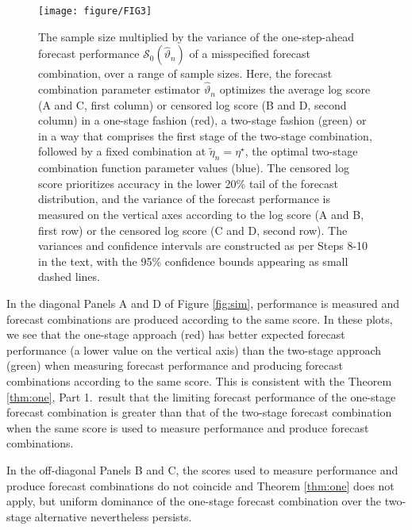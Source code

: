\documentclass[12pt]{article}
\theoremstyle{definition}
\theoremstyle{remark}
\begin{document}
\begin{figure*}[t]
\texttt{[image: figure/FIG3]}
\caption{The sample size multiplied by the variance of the one-step-ahead forecast performance $\mathcal{S}_0(\hat{\vartheta}_n)$ of a misspecified forecast combination, over a range of sample sizes. Here, the forecast combination parameter estimator $\hat{\vartheta}_n$ optimizes the average log score (A and C, first column) or censored log score (B and D, second column) in a one-stage fashion (red), a two-stage fashion (green) or in a way that comprises the first stage of the two-stage combination, followed by a fixed combination at $\tilde{\eta}_n = \eta^{\star}$, the optimal two-stage combination function parameter values (blue). The censored log score prioritizes accuracy in the lower 20\% tail of the forecast distribution, and the variance of the forecast performance is measured on the vertical axes according to the log score (A and B, first row) or the censored log score (C and D, second row). The variances and confidence intervals are constructed as per Steps 8-10 in the text, with the 95\% confidence bounds appearing as small dashed lines.}
\label{fig:sim3}
\end{figure*}

In the diagonal Panels A and D of Figure \ref{fig:sim}, performance is measured and forecast combinations are produced according to the same score. In these plots, we see that the one-stage approach (red) has better expected forecast performance (a lower value on the vertical axis) than the two-stage approach (green) when measuring forecast performance and producing forecast combinations according to the same score. This is consistent with the Theorem \ref{thm:one}, Part 1.\ result that the limiting forecast performance of the one-stage forecast combination is greater than that of the two-stage forecast combination when the same score is used to measure performance and produce forecast combinations.

In the off-diagonal Panels B and C, the scores used to measure performance and produce forecast combinations do not coincide and Theorem \ref{thm:one} does not apply, but uniform dominance of the one-stage forecast combination over the two-stage alternative nevertheless persists.
\end{document}
